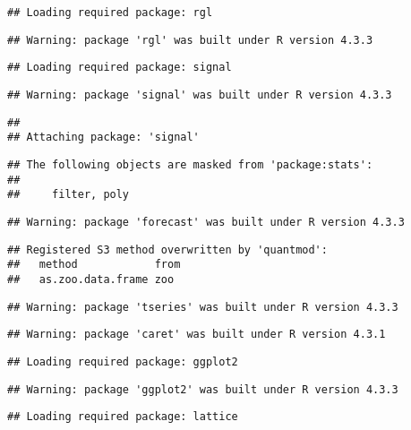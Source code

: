 \documentclass[
]{article}
\begin{document}
\begin{verbatim}
## Loading required package: rgl
\end{verbatim}

\begin{verbatim}
## Warning: package 'rgl' was built under R version 4.3.3
\end{verbatim}

\begin{verbatim}
## Loading required package: signal
\end{verbatim}

\begin{verbatim}
## Warning: package 'signal' was built under R version 4.3.3
\end{verbatim}

\begin{verbatim}
## 
## Attaching package: 'signal'
\end{verbatim}

\begin{verbatim}
## The following objects are masked from 'package:stats':
## 
##     filter, poly
\end{verbatim}

\begin{verbatim}
## Warning: package 'forecast' was built under R version 4.3.3
\end{verbatim}

\begin{verbatim}
## Registered S3 method overwritten by 'quantmod':
##   method            from
##   as.zoo.data.frame zoo
\end{verbatim}

\begin{verbatim}
## Warning: package 'tseries' was built under R version 4.3.3
\end{verbatim}

\begin{verbatim}
## Warning: package 'caret' was built under R version 4.3.1
\end{verbatim}

\begin{verbatim}
## Loading required package: ggplot2
\end{verbatim}

\begin{verbatim}
## Warning: package 'ggplot2' was built under R version 4.3.3
\end{verbatim}

\begin{verbatim}
## Loading required package: lattice
\end{verbatim}
\end{document}
